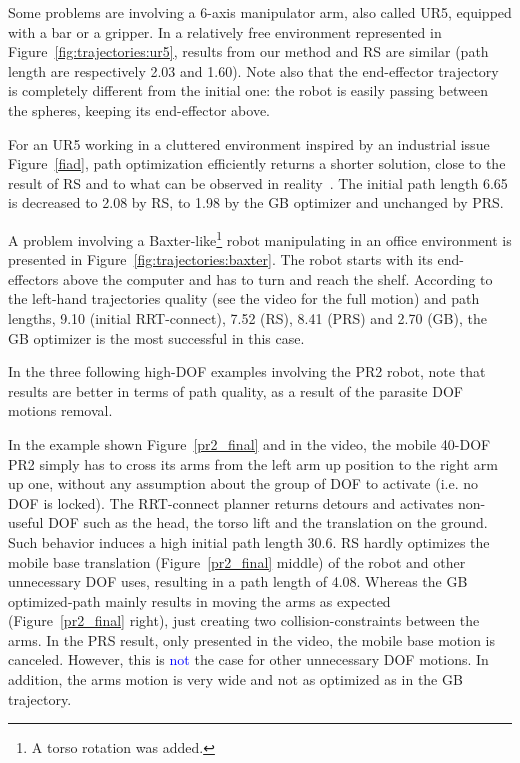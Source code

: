 \documentclass{tADR2e}
\begin{document}
Some problems are 
involving a 6-axis manipulator arm, also called UR5, equipped with a bar or a 
gripper.
In a relatively free environment represented in Figure~\ref{fig:trajectories:ur5}, 
results from our method and RS are similar (path length are respectively 2.03 and 1.60). 
Note also that the end-effector trajectory is completely different from the initial 
one: the robot is easily passing between the spheres, keeping its end-effector 
above.

For an UR5 working in a cluttered environment inspired by an industrial issue 
Figure~\ref{fiad}, path optimization efficiently returns a shorter solution, close 
to the result of RS and to what can be observed in reality~\cite{factory-day-video}. 
The initial path length 6.65 is decreased to 2.08 by RS, to 
1.98 by the GB optimizer and unchanged by PRS.

A problem involving a Baxter-like\footnote{A torso rotation was added.} robot 
manipulating in an office environment is presented in
Figure~\ref{fig:trajectories:baxter}. The robot starts with its end-effectors 
above the computer and has to 
turn and reach the shelf. According to the left-hand trajectories quality (see the 
video for the full motion) and path lengths, 9.10 (initial RRT-connect), 7.52 (RS), 
8.41 (PRS) and 2.70 (GB), the GB optimizer is the most successful in this case.

\vspace{0.4cm}


In the three following high-DOF examples involving the PR2 robot, note that 
results are better in terms of path quality, as a result of the parasite 
DOF motions removal.

In the example shown Figure~\ref{pr2_final} and in the video, the mobile 
40-DOF PR2 simply has to cross its arms from 
the left arm up position to the right arm up one, without any assumption about the group of DOF to activate (i.e. no DOF is locked). 
The RRT-connect planner 
returns detours and activates non-useful DOF such as the head, the torso lift 
and the translation on the ground. Such behavior induces a high initial path length 
30.6. RS hardly optimizes the mobile base 
translation (Figure~\ref{pr2_final} middle) of the robot and other unnecessary DOF 
uses, resulting in a path length of 4.08.
Whereas the GB optimized-path mainly 
results in moving the arms as expected (Figure~\ref{pr2_final} right), just creating 
two collision-constraints between the arms. In the PRS 
result, only presented in the video, the mobile base motion is canceled. However, this is \textcolor{blue}{not} the case for other unnecessary DOF motions. In addition, the arms motion is very wide and not as optimized as in the GB trajectory.
\end{document}
